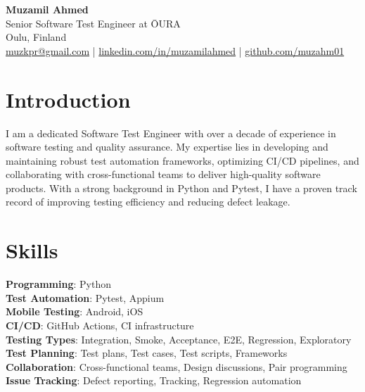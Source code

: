 \documentclass[12pt]{article}
\begin{document}
\begin{center}
    {\LARGE \textbf{Muzamil Ahmed}}\\
    Senior Software Test Engineer at ŌURA \\
    \vspace{0.1cm}
    Oulu, Finland \\
    \vspace{0.2cm}
    \href{mailto:muzkpr@gmail.com}{muzkpr@gmail.com} \hspace{10pt} | \hspace{10pt}
    \href{https://linkedin.com/in/muzamilahmed}{linkedin.com/in/muzamilahmed} \hspace{10pt} | \hspace{10pt}
    \href{https://github.com/muzahm01}{github.com/muzahm01}
\end{center}

\section*{Introduction}\label{introduction}

I am a dedicated Software Test Engineer with over a decade of experience in software
testing and quality assurance. My expertise lies in developing and maintaining robust test automation frameworks, optimizing CI/CD pipelines, and collaborating with cross-functional teams
to deliver high-quality software products. With a strong background in Python and Pytest, I have
a proven track record of improving testing efficiency and reducing defect leakage.


\section*{Skills}\label{skills}

\textbf{Programming}: Python \\
\textbf{Test Automation}: Pytest, Appium \\
\textbf{Mobile Testing}: Android, iOS \\
\textbf{CI/CD}: GitHub Actions, CI infrastructure \\
\textbf{Testing Types}: Integration, Smoke, Acceptance, E2E, Regression, Exploratory \\
\textbf{Test Planning}: Test plans, Test cases, Test scripts, Frameworks \\
\textbf{Collaboration}: Cross-functional teams, Design discussions, Pair programming \\
\textbf{Issue Tracking}: Defect reporting, Tracking, Regression automation
\end{document}
